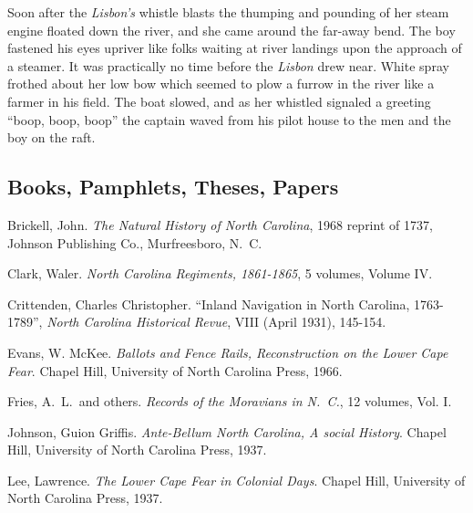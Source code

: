 \documentclass[11pt, a5paper]{book}
\begin{document}
Soon after the \textit{Lisbon's} whistle blasts the thumping and
pounding of her steam engine floated down the river, and she came
around the far-away bend.  The boy fastened his eyes upriver like
folks waiting at river landings upon the approach of a steamer.  It
was practically no time before the \textit{Lisbon} drew near.  White
spray frothed about her low bow which seemed to plow a furrow in the
river like a farmer in his field.  The boat slowed, and as her
whistled signaled a greeting ``boop, boop, boop'' the captain waved
from his pilot house to the men and the boy on the raft.\par



\begin{thebibliography}{99}

\section*{Books, Pamphlets, Theses, Papers}

  Brickell, John.  \emph{The Natural History of North Carolina},
  1968 reprint of 1737, Johnson Publishing Co., Murfreesboro, N.~C.

  Clark, Waler.  \emph{North Carolina Regiments, 1861-1865}, %
  5 volumes, Volume IV. %

  Crittenden, Charles Christopher.  ``Inland Navigation in North Carolina, 1763-1789'', %
  \emph{North Carolina Historical Revue}, VIII (April 1931), 145-154. %

  Evans, W. McKee.  \emph{Ballots and Fence Rails, Reconstruction on the Lower Cape Fear}.
  Chapel Hill, University of North Carolina Press, 1966.

  Fries, A.~L.~and others.  \emph{Records of the Moravians in N.~C.},
  12 volumes, Vol. I.

  Johnson, Guion Griffis.  \emph{Ante-Bellum North Carolina, A social History}.
  Chapel Hill, University of North Carolina Press, 1937.

  Lee, Lawrence.  \emph{The Lower Cape Fear in Colonial Days}.
  Chapel Hill, University of North Carolina Press, 1937.


\end{thebibliography}
\end{document}
